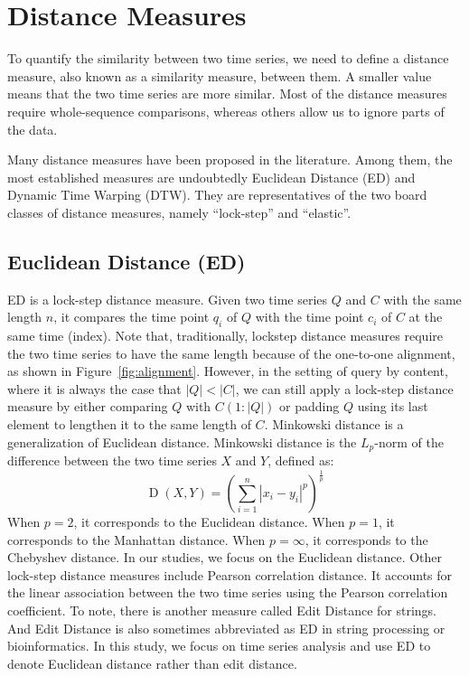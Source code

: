 \section{Distance Measures} \label{sec:dist} %

To quantify the similarity between two time series, we need to define a distance measure, also known as a similarity measure, between them.
A smaller value means that the two time series are more similar.
%
Most of the distance measures require whole-sequence comparisons, whereas others allow us to ignore parts of the data.

Many distance measures have been proposed in the literature.
Among them, the most established measures are undoubtedly Euclidean Distance (ED) and Dynamic Time Warping (DTW).
They are representatives of the two board classes of distance measures, namely ``lock-step'' and ``elastic''.

\subsection{Euclidean Distance (ED)} %


ED is a lock-step distance measure. 
Given two time series $Q$ and $C$ with the same length $n$, it compares the time point $q_i$ of $Q$ with the time point $c_i$ of $C$ at the same time (index). 
Note that, traditionally, lockstep distance measures require the two time series to have the same length because of the one-to-one alignment, as shown in Figure~\ref{fig:alignment}.
However, in the setting of query by content, where it is always the case that $|Q| < |C|$, we can still apply a lock-step distance measure by either comparing $Q$ with $C(1:|Q|)$ or padding $Q$ using its last element to lengthen it to the same length of $C$.
Minkowski distance is a generalization of Euclidean distance.
Minkowski distance is the $L_p$-norm of the difference between the two time series $X$ and $Y$, defined as:
\begin{equation} 
    \operatorname{D}(X, Y) = \left( \sum_{i=1}^n |x_i-y_i|^p \right)^{\frac{1}{p}}
\end{equation}
When $p = 2$, it corresponds to the Euclidean distance.
When $p = 1$, it corresponds to the Manhattan distance.
When $p = \infty$, it corresponds to the Chebyshev distance.
In our studies, we focus on the Euclidean distance.
Other lock-step distance measures include Pearson correlation distance. 
It accounts for the linear association between the two time series using the Pearson correlation coefficient.
To note, there is another measure called Edit Distance for strings. And Edit Distance is also sometimes abbreviated as ED in string processing or bioinformatics.
In this study, we focus on time series analysis and use ED to denote Euclidean distance rather than edit distance.

